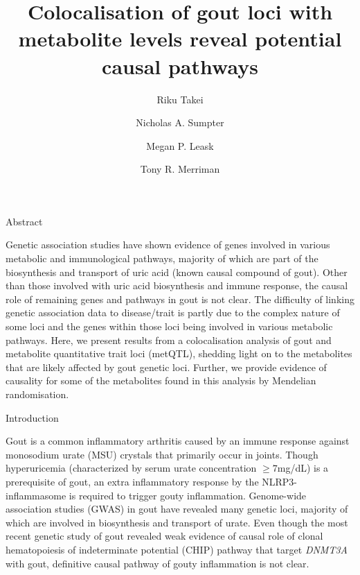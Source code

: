\documentclass[a4paper,10pt]{article}
\title{Colocalisation of gout loci with metabolite levels reveal potential causal pathways}
\date{}
\author[1]{Riku Takei}
\author[1]{Nicholas A. Sumpter}
\author[1]{Megan P. Leask}
\author[1,2]{Tony R. Merriman}
\affil[1]{Division of Clinical Immunology and Rheumatology, University of Alabama at Birmingham, Birmingham, AL, United States}
\affil[2]{Department of Biochemistry, University of Otago, Dunedin, New Zealand}
\begin{document}
\doublespacing

\maketitle


\begin{center}
	\large{Abstract}
\end{center}

\noindent
Genetic association studies have shown evidence of genes involved in various metabolic and immunological pathways, majority of which are part of the biosynthesis and transport of uric acid (known causal compound of gout).
Other than those involved with uric acid biosynthesis and immune response, the causal role of remaining genes and pathways in gout is not clear.
The difficulty of linking genetic association data to disease/trait is partly due to the complex nature of some loci and the genes within those loci being involved in various metabolic pathways.
Here, we present results from a colocalisation analysis of gout and metabolite quantitative trait loci (metQTL), shedding light on to the metabolites that are likely affected by gout genetic loci.
Further, we provide evidence of causality for some of the metabolites found in this analysis by Mendelian randomisation.


\begin{center}
	\large{Introduction}
\end{center}

\noindent
Gout is a common inflammatory arthritis caused by an immune response against monosodium urate (MSU) crystals that primarily occur in joints\cite{dalbeth_gout_2021}.
Though hyperuricemia (characterized by serum urate concentration $\ge7$mg/dL\citep{dalbeth_gout_2021}) is a prerequisite of gout, an extra inflammatory response by the NLRP3-inflammasome is required to trigger gouty inflammation\citep{dalbeth_gout_2021,martinon_gout-associated_2006}.
Genome-wide association studies (GWAS) in gout\citep{tin_target_2019,major_genome-wide_2022,li_replication_2017,kawamura_genome-wide_2019,zhou_global_2022} have revealed many genetic loci, majority of which are involved in biosynthesis and transport of urate.
Even though the most recent genetic study of gout\citep{major_genome-wide_2022} revealed weak evidence of causal role of clonal hema\-topoiesis of indeterminate potential (CHIP) pathway that target \textit{DNMT3A} with gout, definitive causal pathway of gouty inflammation is not clear.
\end{document}
